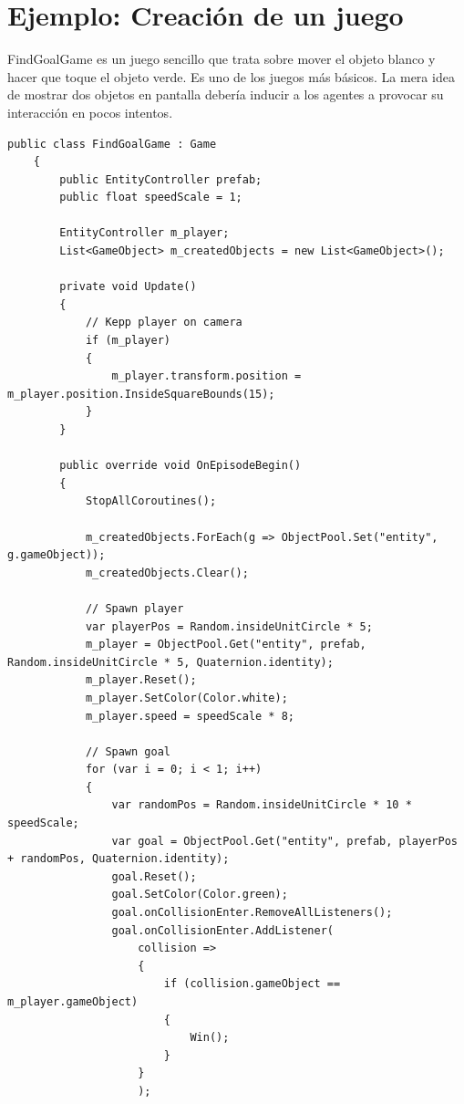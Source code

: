 \section{Ejemplo: Creación de un juego}
 
FindGoalGame es un juego sencillo que trata sobre mover el objeto blanco y hacer que toque el objeto verde. Es uno de los juegos más básicos. La mera idea de mostrar dos objetos en pantalla debería inducir a los agentes a provocar su interacción en pocos intentos. 
 
\vspace*{1cm}
 
\begin{lstlisting}[caption={Ejemplo de implementación del juego FindGoal, el cual trata sobre hacer que el objeto de color blanco toque al objeto verde.}]
    public class FindGoalGame : Game
    {
        public EntityController prefab;
        public float speedScale = 1;
 
        EntityController m_player;
        List<GameObject> m_createdObjects = new List<GameObject>();
 
        private void Update()
        {
            // Kepp player on camera
            if (m_player)
            {
                m_player.transform.position = m_player.position.InsideSquareBounds(15);
            }
        }
 
        public override void OnEpisodeBegin()
        {
            StopAllCoroutines();
 
            m_createdObjects.ForEach(g => ObjectPool.Set("entity", g.gameObject));
            m_createdObjects.Clear();
 
            // Spawn player
            var playerPos = Random.insideUnitCircle * 5;
            m_player = ObjectPool.Get("entity", prefab, Random.insideUnitCircle * 5, Quaternion.identity);
            m_player.Reset();
            m_player.SetColor(Color.white);
            m_player.speed = speedScale * 8;
 
            // Spawn goal
            for (var i = 0; i < 1; i++)
            {
                var randomPos = Random.insideUnitCircle * 10 * speedScale;
                var goal = ObjectPool.Get("entity", prefab, playerPos + randomPos, Quaternion.identity);
                goal.Reset();
                goal.SetColor(Color.green);
                goal.onCollisionEnter.RemoveAllListeners();
                goal.onCollisionEnter.AddListener(
                    collision =>
                    {
                        if (collision.gameObject == m_player.gameObject)
                        {
                            Win();
                        }
                    }
                    );
 

\end{lstlisting}
